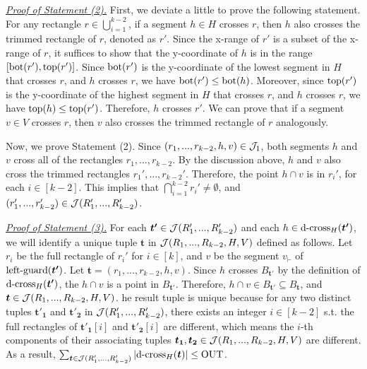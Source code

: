 

\noindent \underline{\em Proof of Statement (2).} 
First, we deviate a little to prove the following statement. For any rectangle $r\in \bigcup_{i = 1}^{k-2}$, if a segment $h\in H$ crosses $r$, then $h$ also crosses the trimmed rectangle of $r$, denoted as $r'$. Since the x-range of $r'$ is a subset of the x-range of $r$, it suffices to show that the y-coordinate of $h$ is in the range $[\mathrm{bot}(r'), \mathrm{top}(r')]$. Since $\mathrm{bot}(r')$ is the y-coordinate of the lowest segment in $H$ that crosses $r$, and $h$ crosses $r$, we have $\mathrm{bot}(r') \leq \mathrm{bot}(h)$. Moreover, since $\mathrm{top}(r')$ is the y-coordinate of the highest segment in $H$ that crosses $r$, and $h$ crosses $r$, we have $\mathrm{top}(h) \leq \mathrm{top}(r')$. Therefore, $h$ crosses $r'$. We can prove that if a segment $v\in V$ crosses $r$, then $v$ also crosses the trimmed rectangle of $r$ analogously.

\vgap
 
Now, we prove Statement (2). Since $(r_1,...,r_{k-2},h,v)\in \mathcal{J}_1$, both segments $h$ and $v$ cross all of the rectangles $r_1,..., r_{k-2}$. By the discussion above, $h$ and $v$ also cross the trimmed rectangles $r_1',..., r_{k-2}'$. Therefore, the point $h \cap v$ is in $r_i'$, for each $i \in [k-2]$. This implies that $\bigcap_{i = 1}^{k-2}r_i' \neq \emptyset$, and $(r_1',..., r_{k-2}')\in \mathcal{J}(R_1',...,R_{k-2}')$.
 

\vgap

\noindent \underline{\em Proof of Statement (3).}
For each $\textrm{\boldmath${t'}$}\in  \mathcal{J}(R_1',...,R_{k-2}')$ and each $h \in \mathrm{d\text{-}cross}_H(\textrm{\boldmath${t'}$})$, we will identify a unique tuple $\bm{t}$ in $\mathcal{J}(R_1,...,R_{k-2},H,V)$ defined as follows. Let $r_i$ be the full rectangle of $r_i'$ for $i \in [k]$, and $v$ be the segment $v_\vdash$ of $\mathrm{left\text{-}guard}(\textrm{\boldmath${t'}$})$. Let $\bm{t} = (r_1,...,r_{k-2},h,v)$. Since $h$ crosses $B_{\bm{t'}}$ by the definition of $\mathrm{d\text{-}cross}_H(\textrm{\boldmath${t'}$})$, the $h\cap v$ is a point in $B_{\bm{t'}}$.
Therefore, $h\cap v \in B_{\bm{t'}} \subseteq B_{\bm{t}}$, and $\textrm{\boldmath${t}$}\in \mathcal{J}(R_1,...,R_{k-2},H,V)$. he result tuple is unique because for any two distinct tuples $\bm{t'_1}$ and $\bm{t'_2}$ in $\mathcal{J}(R_1',...,R_{k-2}')$, there exists an integer $i \in [k-2]$ s.t. the full rectangles of $\bm{t'_1}[i]$ and $\bm{t'_2}[i]$ are different, which means the $i$-th components of their associating tuples $\textrm{\boldmath${t_1}$}, \textrm{\boldmath${t_2}$} \in \mathcal{J}(R_1,...,R_{k-2},H,V)$ are different. As a result, $\sum_{\textrm{\boldmath${t}$}\in \mathcal{J}(R_1',...,R_{k-2}')}  |\mathrm{d\text{-}cross}_H(\textrm{\boldmath${t}$})| \leq \mathrm{OUT}$.

